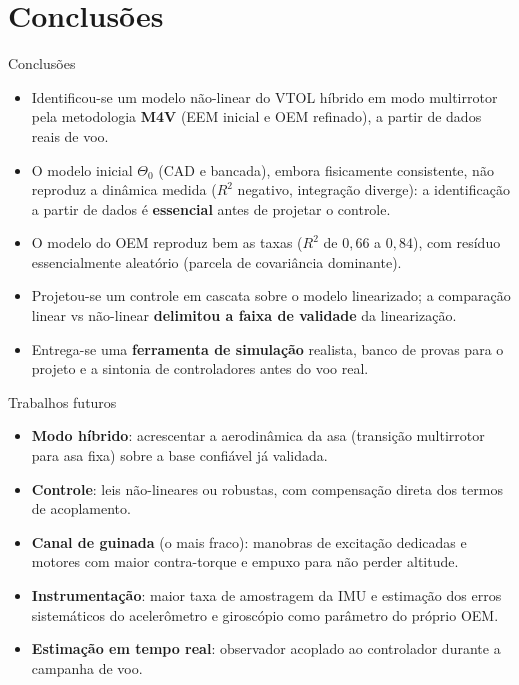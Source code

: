 \documentclass[aspectratio=169,11pt]{beamer}
\begin{document}
\section{Conclusões}
\begin{frame}{Conclusões}
  \begin{itemize}
    \item Identificou-se um modelo não-linear do VTOL híbrido em modo multirrotor pela metodologia \textbf{M4V} (EEM inicial e OEM refinado), a partir de dados reais de voo.
    \item O modelo inicial $\Theta_0$ (CAD e bancada), embora fisicamente consistente, \alert{não reproduz} a dinâmica medida ($R^2$ negativo, integração diverge): a identificação a partir de dados é \textbf{essencial} antes de projetar o controle.
    \item O modelo do OEM reproduz bem as taxas ($R^2$ de $0{,}66$ a $0{,}84$), com resíduo essencialmente aleatório (parcela de covariância dominante).
    \item Projetou-se um controle em cascata sobre o modelo linearizado; a comparação linear vs não-linear \textbf{delimitou a faixa de validade} da linearização.
    \item Entrega-se uma \textbf{ferramenta de simulação} realista, banco de provas para o projeto e a sintonia de controladores antes do voo real.
  \end{itemize}
\end{frame}

\begin{frame}{Trabalhos futuros}
  \begin{itemize}
    \item \textbf{Modo híbrido}: acrescentar a aerodinâmica da asa (transição multirrotor para asa fixa) sobre a base confiável já validada.
    \item \textbf{Controle}: leis não-lineares ou robustas, com compensação direta dos termos de acoplamento.
    \item \textbf{Canal de guinada} (o mais fraco): manobras de excitação dedicadas e motores com maior contra-torque e empuxo para não perder altitude.
    \item \textbf{Instrumentação}: maior taxa de amostragem da IMU e estimação dos erros sistemáticos do acelerômetro e giroscópio como parâmetro do próprio OEM.
    \item \textbf{Estimação em tempo real}: observador acoplado ao controlador durante a campanha de voo.
  \end{itemize}
\end{frame}
\end{document}

